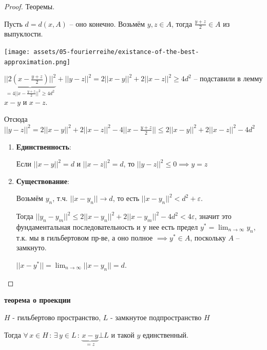 \begin{proof}
    Теоремы.

    Пусть $d = d(x, A)$ -- оно конечно. Возьмём $y, z \in A$, тогда $\frac{y + z}{2} \in A$ из выпуклости.

    \begin{center}
        \texttt{[image: assets/05-fourierreihe/existance-of-the-best-approximation.png]}
    \end{center}

    $\underbrace{|| 2 \left(x - \frac{y + z}{2}\right) ||^2}_{= 4 || x - \frac{y + z}{2} ||^2 \geqslant 4d^2} + ||y - z||^2 = 2 ||x - y||^2 + 2||x - z||^2 \geqslant 4d^2$ -- подставили в лемму $x - y$ и $x - z$.

    Отсюда $||y-z||^2 = 2 ||x - y||^2 + 2 ||x - z||^2 - 4 || x - \frac{y + z}{2}|| \leqslant 2 ||x - y||^2 + 2||x - z||^2 - 4d^2$

    \begin{enumerate}
        \item {
            \textbf{Единственность}:

            Если $||x - y||^2 = d$ и $||x - z||^2 = d$, то $||y - z||^2 \leqslant 0 \implies y = z$
        }
        \item {
            \textbf{Существование}:

            Возьмём $y_n$, т.ч. $||x - y_n|| \rightarrow d$, то есть $|| x - y_n ||^2 < d^2 + \varepsilon$.

            Тогда $||y_n - y_m||^2 \leqslant 2 ||x - y_n||^2 + 2||x - y_m||^2 - 4d^2 < 4\varepsilon$, значит это фундаментальная последовательность и у нее есть предел $y^* = \lim_{n \to \infty} y_n$, т.к. мы в гильбертовом пр-ве, а оно полное $\implies y^* \in A$, поскольку $A$ -- замкнуто.

            $||x - y^*|| = \lim_{n \to \infty} ||x - y_n|| = d$.
        }
    \end{enumerate}
\end{proof}

\begin{theorem}
    \textbf{теорема о проекции}

    $H$ - гильбертово пространство, $L$ - замкнутое подпространство $H$

    Тогда $\forall \, x \in H \, : \, \exists \, y \in L \, : \, \underbrace{x - y}_{=z} \bot L$ и
    такой $y$ единственный.
\end{theorem}

